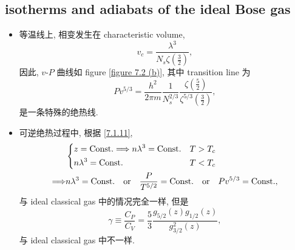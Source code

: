 \subsection{isotherms and adiabats of the ideal Bose gas}
\begin{itemize}
	\item 等温线上, 相变发生在 characteristic volume,
	\begin{equation}
		v_c = \frac{\lambda^3}{N_s \zeta(\frac{3}{2})},
	\end{equation}
	因此, $v$-$P$ 曲线如 figure \ref{figure 7.2 (b)}, 其中 transition line 为
	\begin{equation}
		P v^{5 / 3} = \frac{h^2}{2 \pi m} \frac{1}{N_s^{2 / 3}} \frac{\zeta(\frac{5}{2})}{\zeta^{5 / 3}(\frac{3}{2})},
	\end{equation}
	是一条特殊的绝热线.
	
	\item 可逆绝热过程中, 根据 \eqref{7.1.11},
	\begin{align}
		& \begin{dcases}
			z = \text{Const.} \Longrightarrow n \lambda^3 = \text{Const.} & T > T_c \\
			n \lambda^3 = \text{Const.} & T < T_c
		\end{dcases} \notag \\
		\Longrightarrow & n \lambda^3 = \text{Const.} \quad \text{or} \quad \frac{P}{T^{5 / 2}} = \text{Const.} \quad \text{or} \quad P v^{5 / 3} = \text{Const.},
	\end{align}
	与 ideal classical gas 中的情况完全一样, 但是
	\begin{equation}
		\gamma \equiv \frac{C_P}{C_V} = \frac{5}{3} \frac{g_{5 / 2}(z) g_{1 / 2}(z)}{g_{3 / 2}^2(z)},
	\end{equation}
	与 ideal classical gas 中不一样.
\end{itemize}


